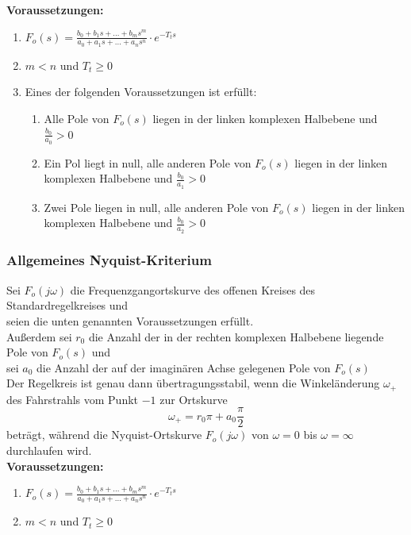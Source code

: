 \documentclass[10pt,a4paper]{article}
\begin{document}
\textbf{Voraussetzungen:}
\begin{enumerate}
	\item $F_o(s) = \frac{b_0 + b_1s + \dots + b_ms^m}{a_0 + a_1s + \dots + a_ns^n} ⋅ e^{-T_ts}$
	\item $m < n$ und $T_t ≥ 0$
	\item Eines der folgenden Voraussetzungen ist erfüllt:
	\begin{enumerate}
		\item Alle Pole von $F_o(s)$ liegen in der linken komplexen Halbebene und $\frac{b_0}{a_0} > 0$
		\item Ein Pol liegt in null, alle anderen Pole von $F_o(s)$ liegen in der linken komplexen Halbebene und $\frac{b_0}{a_1} > 0$
		\item Zwei Pole liegen in null, alle anderen Pole von $F_o(s)$ liegen in der linken komplexen Halbebene und $\frac{b_0}{a_2} > 0$
	\end{enumerate}
\end{enumerate}

\subsubsection{Allgemeines Nyquist-Kriterium}
Sei $F_o(j \omega)$ die Frequenzgangortskurve des offenen Kreises des Standardregelkreises und \\
seien die unten genannten Voraussetzungen erfüllt. \\
Außerdem sei $r_0$ die Anzahl der in der rechten komplexen Halbebene liegende Pole von $F_o(s)$ und \\
sei $a_0$ die Anzahl der auf der imaginären Achse gelegenen Pole von $F_o(s)$ \\

Der Regelkreis ist genau dann übertragungsstabil, wenn die Winkeländerung $\omega_+$ des Fahrstrahls vom Punkt $-1$ zur Ortskurve
$$
	\omega_+ = r_0 \pi + a_0 \frac{\pi}{2}
$$
beträgt, während die Nyquist-Ortskurve $F_o(j \omega)$ von $\omega = 0$ bis $\omega = ∞$ durchlaufen wird. \\

\textbf{Voraussetzungen:}
\begin{enumerate}
	\item $F_o(s) = \frac{b_0 + b_1s + \dots + b_ms^m}{a_0 + a_1s + \dots + a_ns^n} ⋅ e^{-T_ts}$
	\item $m < n$ und $T_t ≥ 0$
\end{enumerate}
\end{document}
